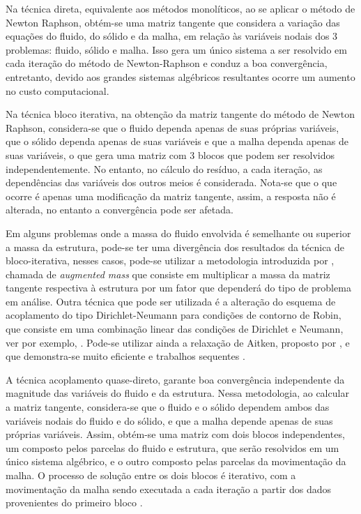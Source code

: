 \documentclass[tese_patricia.tex]{subfiles}
\begin{document}
Na técnica direta, equivalente aos métodos monolíticos, ao se aplicar o método de Newton Raphson, obtém-se uma matriz tangente que considera a variação das equações do fluido, do sólido e da malha, em relação às variáveis nodais dos 3 problemas: fluido, sólido e malha. Isso gera um único sistema a ser resolvido em cada iteração do método de Newton-Raphson e conduz a boa convergência, entretanto, devido aos grandes sistemas algébricos resultantes ocorre um aumento no custo computacional.

Na técnica bloco iterativa, na obtenção da matriz tangente do método de Newton Raphson, considera-se que o fluido dependa apenas de suas próprias variáveis, que o sólido dependa apenas de suas variáveis e que a malha dependa apenas de suas variáveis, o que gera uma matriz com 3 blocos que podem ser resolvidos independentemente. No entanto, no cálculo do resíduo, a cada iteração, as dependências das variáveis dos outros meios é considerada. Nota-se que o que ocorre é apenas uma modificação da matriz tangente, assim, a resposta não é alterada, no entanto a convergência pode ser afetada.

Em alguns problemas onde a massa do fluido envolvida é semelhante ou superior a massa da estrutura, pode-se ter uma divergência dos resultados da técnica de bloco-iterativa, nesses casos, pode-se utilizar a metodologia introduzida por , chamada de \textit{augmented mass} que consiste em multiplicar a massa da matriz tangente respectiva à estrutura por um fator que dependerá do tipo de problema em análise. Outra técnica que pode ser utilizada é a alteração do esquema de acoplamento do tipo Dirichlet-Neumann para condições de contorno de Robin, que consiste em uma combinação linear das condições de Dirichlet e Neumann, ver por exemplo, . Pode-se utilizar ainda a relaxação de Aitken, proposto por , e que demonstra-se muito eficiente e trabalhos sequentes \cite{KuttlerW:2008,FernandesCS:2019}.

A técnica acoplamento quase-direto, garante boa convergência independente da magnitude das variáveis do fluido e da estrutura. Nessa metodologia, ao calcular a matriz tangente, considera-se que o fluido e o sólido dependem ambos das variáveis nodais do fluido e do sólido, e que a malha depende apenas de suas próprias variáveis. Assim, obtém-se uma matriz com dois blocos independentes, um composto pelos parcelas do fluido e estrutura, que serão resolvidos em um único sistema algébrico, e o outro composto pelas parcelas da movimentação da malha. O processo de solução entre os dois blocos é iterativo, com a movimentação da malha sendo executada a cada iteração a partir dos dados provenientes do primeiro bloco \cite{TezduyarSKS:2006,TezduyarSS:2006}.
\end{document}
